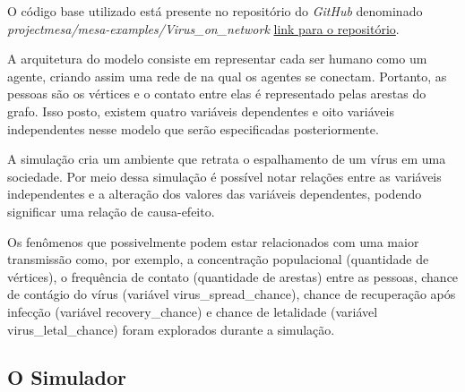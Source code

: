 O código base utilizado está presente no repositório do \textit{GitHub} denominado \textit{projectmesa/mesa-examples/Virus\_on\_network} \href{https://github.com/projectmesa/mesa-examples/tree/main/examples/Virus_on_Network}{link para o repositório}.

A arquitetura do modelo consiste em representar cada ser humano como um agente, criando assim uma rede de na qual os agentes se conectam. Portanto, as pessoas são os vértices e o contato entre elas é representado pelas arestas do grafo. Isso posto, existem quatro variáveis dependentes e oito variáveis independentes nesse modelo que serão especificadas posteriormente.

A simulação cria um ambiente que retrata o espalhamento de um vírus em uma sociedade. Por meio dessa simulação é possível notar relações entre as variáveis independentes e a alteração dos valores das variáveis dependentes, podendo significar uma relação de causa-efeito.

Os fenômenos que possivelmente podem estar relacionados com uma maior transmissão como, por exemplo,  a concentração populacional (quantidade de vértices), o frequência de contato (quantidade de arestas) entre as pessoas, chance de contágio do vírus (variável virus\_spread\_chance), chance de recuperação após infecção (variável recovery\_chance) e chance de letalidade (variável virus\_letal\_chance) foram explorados durante a simulação.

\subsection{O Simulador}

